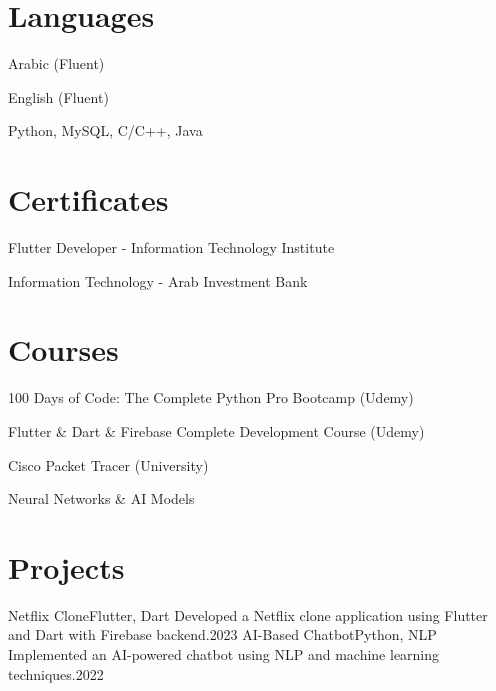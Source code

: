 \documentclass[letterpaper,10.5pt]{article}
\begin{document}
\section{Languages}
  \resumeSubHeadingListStart
    \item Arabic (Fluent)
    \item English (Fluent)
    \item Python, MySQL, C/C++, Java
  \resumeSubHeadingListEnd

\section{Certificates}
  \resumeSubHeadingListStart
    \item Flutter Developer - Information Technology Institute
    \item Information Technology - Arab Investment Bank
  \resumeSubHeadingListEnd

\section{Courses}
  \resumeSubHeadingListStart
    \item 100 Days of Code: The Complete Python Pro Bootcamp (Udemy)
    \item Flutter \& Dart \& Firebase Complete Development Course (Udemy)
    \item Cisco Packet Tracer (University)
    \item Neural Networks \& AI Models
  \resumeSubHeadingListEnd

\section{Projects}
  \resumeSubHeadingListStart
    \resumeSubheading
      {Netflix Clone}{Flutter, Dart}
      {Developed a Netflix clone application using Flutter and Dart with Firebase backend.}{2023}
    \resumeSubheading
      {AI-Based Chatbot}{Python, NLP}
      {Implemented an AI-powered chatbot using NLP and machine learning techniques.}{2022}
  \resumeSubHeadingListEnd
\end{document}
